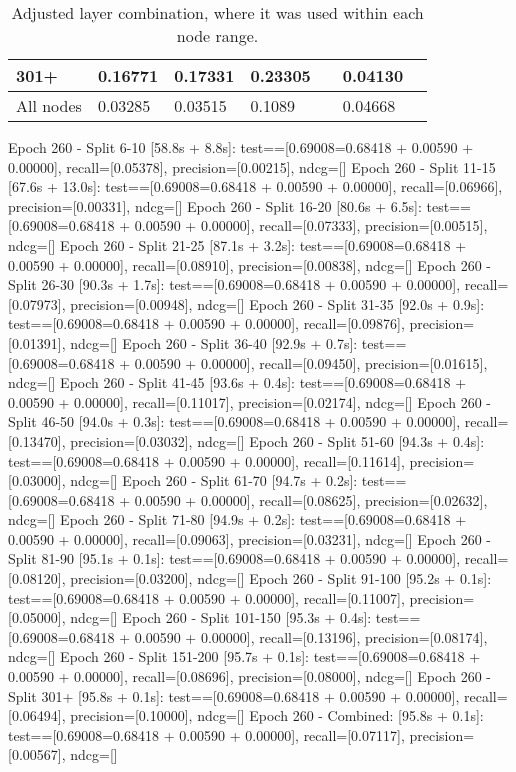 \begin{table*}[h!]
\begin{tabular}{|l|l|l||l|l||l|l|}
        301+      & 0.16771                                 & 0.17331                               & 0.23305                          &                  & 0.04130       &                  \\ \hline
        All nodes & 0.03285                                 & 0.03515                               & 0.1089                           &                  & 0.04668       &                  \\ \hline
    \end{tabular}
    \caption{Adjusted layer combination, where it was used within each node range.}
    \label{tab:ndcg-adjusted-layer-bad-performance}
\end{table*}

Epoch 260  - Split 6-10 [58.8s + 8.8s]:     test==[0.69008=0.68418 + 0.00590 + 0.00000], recall=[0.05378], precision=[0.00215], ndcg=[]
Epoch 260  - Split 11-15 [67.6s + 13.0s]:   test==[0.69008=0.68418 + 0.00590 + 0.00000], recall=[0.06966], precision=[0.00331], ndcg=[]
Epoch 260  - Split 16-20 [80.6s + 6.5s]:    test==[0.69008=0.68418 + 0.00590 + 0.00000], recall=[0.07333], precision=[0.00515], ndcg=[]
Epoch 260  - Split 21-25 [87.1s + 3.2s]:    test==[0.69008=0.68418 + 0.00590 + 0.00000], recall=[0.08910], precision=[0.00838], ndcg=[]
Epoch 260  - Split 26-30 [90.3s + 1.7s]:    test==[0.69008=0.68418 + 0.00590 + 0.00000], recall=[0.07973], precision=[0.00948], ndcg=[]
Epoch 260  - Split 31-35 [92.0s + 0.9s]:    test==[0.69008=0.68418 + 0.00590 + 0.00000], recall=[0.09876], precision=[0.01391], ndcg=[]
Epoch 260  - Split 36-40 [92.9s + 0.7s]:    test==[0.69008=0.68418 + 0.00590 + 0.00000], recall=[0.09450], precision=[0.01615], ndcg=[]
Epoch 260  - Split 41-45 [93.6s + 0.4s]:    test==[0.69008=0.68418 + 0.00590 + 0.00000], recall=[0.11017], precision=[0.02174], ndcg=[]
Epoch 260  - Split 46-50 [94.0s + 0.3s]:    test==[0.69008=0.68418 + 0.00590 + 0.00000], recall=[0.13470], precision=[0.03032], ndcg=[]
Epoch 260  - Split 51-60 [94.3s + 0.4s]:    test==[0.69008=0.68418 + 0.00590 + 0.00000], recall=[0.11614], precision=[0.03000], ndcg=[]
Epoch 260  - Split 61-70 [94.7s + 0.2s]:    test==[0.69008=0.68418 + 0.00590 + 0.00000], recall=[0.08625], precision=[0.02632], ndcg=[]
Epoch 260  - Split 71-80 [94.9s + 0.2s]:    test==[0.69008=0.68418 + 0.00590 + 0.00000], recall=[0.09063], precision=[0.03231], ndcg=[]
Epoch 260  - Split 81-90 [95.1s + 0.1s]:    test==[0.69008=0.68418 + 0.00590 + 0.00000], recall=[0.08120], precision=[0.03200], ndcg=[]
Epoch 260  - Split 91-100 [95.2s + 0.1s]:   test==[0.69008=0.68418 + 0.00590 + 0.00000], recall=[0.11007], precision=[0.05000], ndcg=[]
Epoch 260  - Split 101-150 [95.3s + 0.4s]:  test==[0.69008=0.68418 + 0.00590 + 0.00000], recall=[0.13196], precision=[0.08174], ndcg=[]
Epoch 260  - Split 151-200 [95.7s + 0.1s]:  test==[0.69008=0.68418 + 0.00590 + 0.00000], recall=[0.08696], precision=[0.08000], ndcg=[]
Epoch 260  - Split 301+ [95.8s + 0.1s]:     test==[0.69008=0.68418 + 0.00590 + 0.00000], recall=[0.06494], precision=[0.10000], ndcg=[]
Epoch 260 - Combined: [95.8s + 0.1s]:       test==[0.69008=0.68418 + 0.00590 + 0.00000], recall=[0.07117], precision=[0.00567], ndcg=[]

